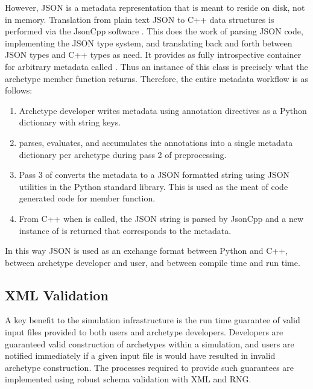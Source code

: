 However, \gls{JSON} is a metadata representation that is meant to reside on disk, 
not in memory. Translation from plain text \gls{JSON} to C++ data structures is 
performed via the JsonCpp software \cite{eltuhamy2014native}. This does the work 
of parsing \gls{JSON} code, implementing the \gls{JSON} type system, and translating back and
forth between \gls{JSON} types and C++ types as need. It provides as fully 
introspective 
container for arbitrary metadata called .  Thus an instance of this 
class is precisely what the  archetype member function returns.
Therefore, the entire metadata workflow is as follows:
\begin{enumerate}
    \item Archetype developer writes metadata using annotation directives as a
          Python dictionary with string keys.
    \item \cycpp parses, evaluates, and accumulates the annotations into a single 
          metadata dictionary per archetype during pass 2 of preprocessing.
    \item Pass 3 of \cycpp converts the metadata to a \gls{JSON} formatted string using 
          \gls{JSON} utilities in the Python standard library. This is used as the meat of
          code generated code for  member function.
    \item From C++ when  is called, the \gls{JSON} string is parsed 
          by JsonCpp and a new instance of  is returned that
          corresponds to the metadata.
\end{enumerate}
In this way \gls{JSON} is used as an exchange format between Python and C++, between 
archetype developer and user, and between compile time and run time.

\subsection{XML Validation}

A key benefit to the \Cyclus simulation infrastructure is the run time guarantee
of valid input files provided to both users and archetype developers. Developers
are guaranteed valid construction of archetypes within a simulation, and users
are notified immediately if a given input file is would have resulted in invalid
archetype construction. The processes required to provide such guarantees are
implemented using robust schema validation with \acrlong{XML} and \acrlong{RNG}.

